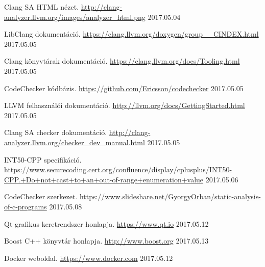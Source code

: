 \documentclass[a4paper,12pt]{report}
\begin{document}
\begin{thebibliography}{xx}
 Clang SA HTML nézet. \url{http://clang-analyzer.llvm.org/images/analyzer\_html.png} 2017.05.04

 LibClang dokumentáció. \url{https://clang.llvm.org/doxygen/group\_\_CINDEX.html} 2017.05.05

 Clang könyvtárak dokumentáció. \url{https://clang.llvm.org/docs/Tooling.html} 2017.05.05

 CodeChecker kódbázis. \url{https://github.com/Ericsson/codechecker} 2017.05.05

 LLVM felhasználói dokumentáció. \url{http://llvm.org/docs/GettingStarted.html} 2017.05.05

 Clang SA checker dokumentáció. \url{http://clang-analyzer.llvm.org/checker\_dev\_manual.html} 2017.05.05

 INT50-CPP specifikáció. \url{https://www.securecoding.cert.org/confluence/display/cplusplus/INT50-CPP.+Do+not+cast+to+an+out-of-range+enumeration+value} 2017.05.06

 CodeChecker szerkezet. \url{https://www.slideshare.net/GyorgyOrban/static-analysis-of-c-programs} 2017.05.08

 Qt grafikus keretrendszer honlapja. \url{https://www.qt.io} 2017.05.12

 Boost C++ könyvtár honlapja. \url{http://www.boost.org} 2017.05.13

 Docker weboldal. \url{https://www.docker.com} 2017.05.12

\end{thebibliography}
\end{document}
